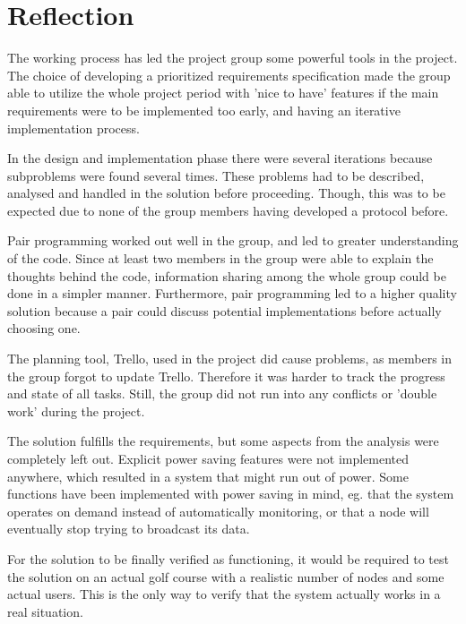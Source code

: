 \section{Reflection}
The working process has led the project group some powerful tools in the project. The choice of developing a prioritized requirements specification made the group able to utilize the whole project period with 'nice to have' features if the main requirements were to be implemented too early, and having an iterative implementation process.

In the design and implementation phase there were several iterations because subproblems were found several times. These problems had to be described, analysed and handled in the solution before proceeding. Though, this was to be expected due to none of the group members having developed a protocol before.

Pair programming worked out well in the group, and led to greater understanding of the code. Since at least two members in the group were able to explain the thoughts behind the code, information sharing among the whole group could be done in a simpler manner. Furthermore, pair programming led to a higher quality solution because a pair could discuss potential implementations before actually choosing one.

The planning tool, Trello, used in the project did cause problems, as members in the group forgot to update Trello. Therefore it was harder to track the progress and state of all tasks. Still, the group did not run into any conflicts or 'double work' during the project.

The solution fulfills the requirements, but some aspects from the analysis were completely left out. Explicit power saving features were not implemented anywhere, which resulted in a system that might run out of power. Some functions have been implemented with power saving in mind, eg. that the system operates on demand instead of automatically monitoring, or that a node will eventually stop trying to broadcast its data.

For the solution to be finally verified as functioning, it would be required to test the solution on an actual golf course with a realistic number of nodes and some actual users. This is the only way to verify that the system actually works in a real situation.